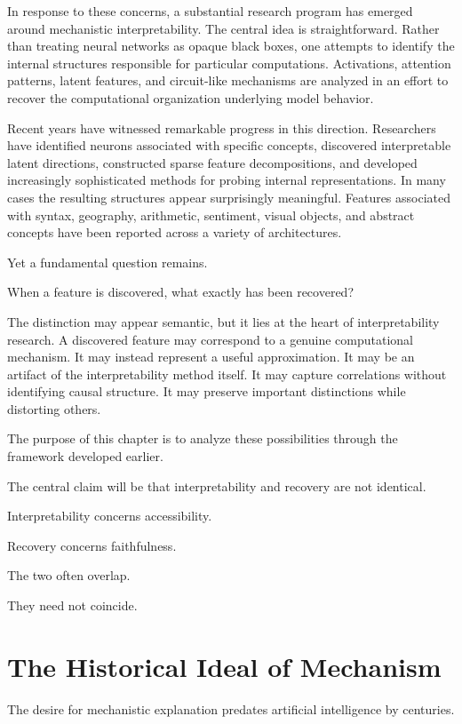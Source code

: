 \documentclass[11pt,oneside,openany]{book}
\begin{document}
In response to these concerns, a substantial research program has emerged around mechanistic interpretability. The central idea is straightforward. Rather than treating neural networks as opaque black boxes, one attempts to identify the internal structures responsible for particular computations. Activations, attention patterns, latent features, and circuit-like mechanisms are analyzed in an effort to recover the computational organization underlying model behavior.

Recent years have witnessed remarkable progress in this direction. Researchers have identified neurons associated with specific concepts, discovered interpretable latent directions, constructed sparse feature decompositions, and developed increasingly sophisticated methods for probing internal representations. In many cases the resulting structures appear surprisingly meaningful. Features associated with syntax, geography, arithmetic, sentiment, visual objects, and abstract concepts have been reported across a variety of architectures.

Yet a fundamental question remains.

When a feature is discovered, what exactly has been recovered?

The distinction may appear semantic, but it lies at the heart of interpretability research. A discovered feature may correspond to a genuine computational mechanism. It may instead represent a useful approximation. It may be an artifact of the interpretability method itself. It may capture correlations without identifying causal structure. It may preserve important distinctions while distorting others.

The purpose of this chapter is to analyze these possibilities through the framework developed earlier.

The central claim will be that interpretability and recovery are not identical.

Interpretability concerns accessibility.

Recovery concerns faithfulness.

The two often overlap.

They need not coincide.

\section{The Historical Ideal of Mechanism}

The desire for mechanistic explanation predates artificial intelligence by centuries.
\end{document}
